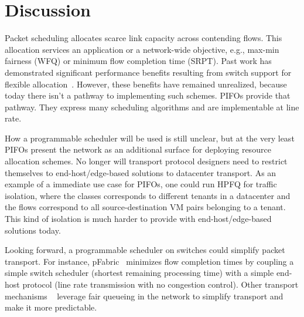 \pagebreak
\section{Discussion}
\label{s:real_discussion}

Packet scheduling allocates scarce link capacity across contending flows.  This
allocation services an application or a network-wide objective, e.g., max-min
fairness (WFQ) or minimum flow completion time (SRPT).  Past work has
demonstrated significant performance benefits resulting from switch support
for flexible allocation~\cite{pFabric, baraat, numfabric, nosilverbullet}.
However, these benefits have remained unrealized, because today
there isn't a pathway to implementing such schemes.
PIFOs provide that pathway. They express many scheduling
algorithms and are implementable at line rate.

How a programmable scheduler will be used is still unclear, but at the very
least PIFOs present the network as an additional surface for deploying
resource allocation schemes. No longer will transport protocol designers need
to restrict themselves to end-host/edge-based solutions to datacenter
transport.  As an example of a immediate use case for PIFOs, one could run HPFQ
for traffic isolation, where the classes corresponds to different tenants in a
datacenter and the flows correspond to all source-destination VM pairs
belonging to a tenant. This kind of isolation is much harder to provide with
end-host/edge-based solutions today.

Looking forward, a programmable scheduler on switches could
simplify packet transport. For instance, pFabric~\cite{pFabric}
minimizes flow completion times by coupling a simple switch
scheduler (shortest remaining processing time) with a simple end-host protocol
(line rate transmission with no congestion control). Other transport mechanisms
~\cite{packetpair, numfabric} leverage fair queueing in the network to simplify
transport and make it more predictable.

